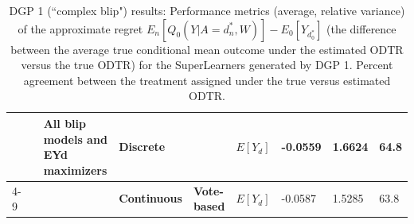 \documentclass[a4paper,12pt]{article}
\begin{document}
\begin{table}[]
{\begin{tabular}{|l|l|l|l|l|l|l|l|l|}
                                &                                      & \multirow{2}{*}{\textbf{All blip models and EYd maximizers}} & \multicolumn{2}{l|}{\textbf{Discrete}}                                      & \textbf{$E[Y_d]$} & -0.0559              & 1.6624                        & 64.8              \\ \cline{4-9} 
                                &                                      &                                                              & \textbf{Continuous}                  & \textbf{Vote-based}                  & \textbf{$E[Y_d]$} & -0.0587              & 1.5285                        & 63.8              \\ \hline
\end{tabular}
}
\caption{DGP 1 (``complex blip") results: Performance metrics (average, relative variance) of the approximate regret $E_n [Q_0(Y|A= d_n^*,W)]-E_0 [Y_{d_0^*}]$ (the difference between the average true conditional mean outcome under the estimated ODTR versus the true ODTR) for the SuperLearners generated by DGP 1. Percent agreement between the treatment assigned under the true versus estimated ODTR.}
\label{table3}
\end{table}
\end{document}
